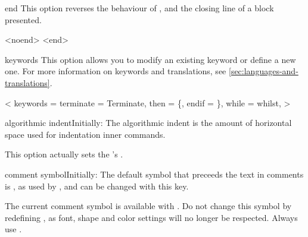 \documentclass[a4paper, 11pt]{article}
\begin{document}
\begin{Optiondef}{end}{}
    This option reverses the behaviour of , and the closing line of a block presented.
\end{Optiondef}

\begin{PDExample}
    \begin{algorithmic}<noend>
                <end>
                \EndIf
            \EndFor
        \EndFor
    \end{algorithmic}
\end{PDExample}

\begin{Optiondef}{keywords}{}{}
    This option allows you to modify an existing keyword or define a new one. For more information on keywords and translations, see \cref{sec:languages-and-translations}.
\end{Optiondef}

\begin{PDExample}
    \begin{algorithmic}<
            keywords = {
                terminate = Terminate, %
                then = \{, %
                endif = \}, %
                while = whilst,  %
            }
        >
        \While{\True}
            \EndIf
        \EndWhile
    \end{algorithmic}
\end{PDExample}

\begin{Optiondef}{algorithmic indent}{}{Initially: \PDInline{1.5em}}
    The algorithmic indent is the amount of horizontal space used for indentation inner commands.

    This option actually sets the 's .
\end{Optiondef}

\begin{Optiondef}{comment symbol}{}{Initially: \PDInline{$\triangleright$}}
    The default symbol that preceeds the text in comments is \CommentSymbol, as used by , and can be changed with this key.

    The current comment symbol is available with . Do not change this symbol by redefining , as font, shape and color settings will no longer be respected. Always use .
\end{Optiondef}
\end{document}
